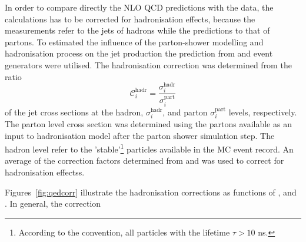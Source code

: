 In order to compare directly the NLO QCD predictions with the data, the calculations has to be corrected for hadronisation effects, because the measurements refer to the jets of hadrons while the predictions to that of partons. To estimated the influence of the parton-shower modelling and hadronisation process on the jet production the prediction from \ariadne and \lepto event generators were utilised. The hadronisation correction was determined from the ratio 
\begin{equation}
 \mathcal{C}^\text{hadr}_i = \frac{\sigma_i^\text{hadr}}{\sigma_i^\text{part}}
 \label{eq:hadrcor}
\end{equation}
of the jet cross sections at the hadron, $\sigma_i^\text{hadr}$, and parton $\sigma_i^\text{part}$ levels, respectively. The parton level cross section was determined using the partons available as an input to hadronisation model after the parton shower simulation step. The hadron level refer to the 'stable'\footnote{According to the \zeus convention, all particles with the lifetime $\tau > 10$ ns.} particles available in the MC event record. An average of the correction factors determined from \ariadne and \lepto was used to correct for hadronisation effectss.

Figures~\ref{fig:qedcorr} illustrate the hadronisation corrections as functions of \etjetb, \etajetb and \qsq. In general, the correction